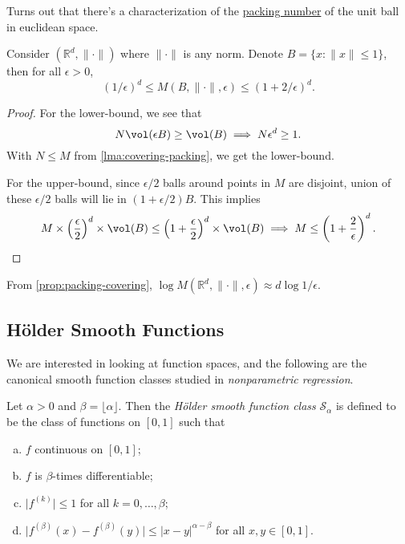 Turns out that there's a characterization of the \hyperref[def:packing-number]{packing number} of the unit ball in euclidean space.

\begin{proposition}\label{prop:packing-covering}
	Consider \((\mathbb{R} ^d, \lVert \cdot \rVert )\) where \(\lVert \cdot \rVert \) is any norm. Denote \(B = \{ x \colon \lVert x \rVert \leq 1 \} \), then for all \(\epsilon > 0\),
	\[
		(1 / \epsilon) ^d \leq M(B, \lVert \cdot \rVert , \epsilon ) \leq (1 + 2 / \epsilon )^d.
	\]
\end{proposition}
\begin{proof}
	For the lower-bound, we see that
	\[
		N \vol(\epsilon B) \geq \vol(B)
		\implies N \epsilon ^d \geq 1.
	\]
	With \(N \leq M\) from \autoref{lma:covering-packing}, we get the lower-bound.

	For the upper-bound, since \(\epsilon / 2\) balls around points in \(M\) are disjoint, union of these \(\epsilon / 2\) balls will lie in \((1 + \epsilon / 2)B\). This implies
	\[
		M \times \left( \frac{\epsilon}{2} \right) ^d \times \vol(B)
		\leq \left( 1 + \frac{\epsilon}{2} \right) ^d \times \vol(B)
		\implies M \leq \left( 1 + \frac{2}{\epsilon } \right) ^d.
	\]
\end{proof}

\begin{note}
	From \autoref{prop:packing-covering}, \(\log M(\mathbb{R} ^d, \lVert \cdot \rVert , \epsilon ) \approx d \log 1 / \epsilon \).
\end{note}

\subsection{Hölder Smooth Functions}
We are interested in looking at function spaces, and the following are the canonical smooth function classes studied in \emph{nonparametric regression}.

\begin{definition}\label{def:Holder-smooth-function-class}
	Let \(\alpha > 0\) and \(\beta = \lfloor \alpha \rfloor\). Then the \emph{Hölder smooth function class} \(\mathcal{S} _\alpha \) is defined to be the class of functions on \([0, 1]\) such that
	\begin{enumerate}[(a)]
		\item \(f\) continuous on \([0, 1]\);
		\item \(f\) is \(\beta \)-times differentiable;
		\item \(\vert f^{(k)} \vert \leq 1\) for all \(k = 0, \dots , \beta \);
		\item \(\vert f^{(\beta )}(x) - f^{(\beta )}(y) \vert \leq \vert x - y \vert ^{\alpha - \beta }\) for all \(x, y \in [0, 1]\).
	\end{enumerate}
\end{definition}


